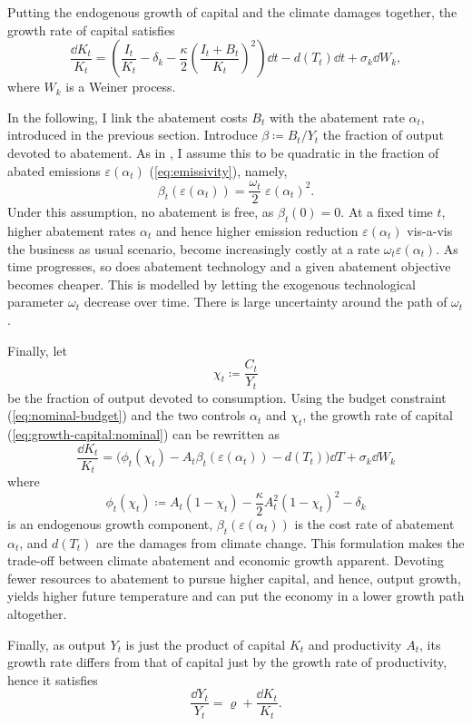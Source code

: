 \documentclass[../../main.tex]{subfiles}
\begin{document}
Putting the endogenous growth of capital and the climate damages together, the growth rate of capital satisfies \begin{equation} \label{eq:growth-capital:nominal}
    \frac{\dd{K}_t}{K_t} = \left(\frac{I_t}{K_t} - \delta_k - \frac{\kappa}{2} \left( \frac{I_t + B_t}{K_t} \right)^2 \right) \dd{t} - d(T_t) \dd{t} + \sigma_k \dd{W}_k,
\end{equation} where $W_k$ is a Weiner process.

In the following, I link the abatement costs $B_t$ with the abatement rate $\alpha_t$, introduced in the previous section. Introduce $\beta \coloneqq B_t / Y_t$ the fraction of output devoted to abatement. As in \cite{nordhaus_optimal_1992}, I assume this to be quadratic in the fraction of abated emissions $\varepsilon(\alpha_t)$ (\ref{eq:emissivity}), namely, \begin{equation} \label{eq:abatement-costs}
    \beta_t(\varepsilon(\alpha_t)) = \frac{\omega_t}{2} \; \varepsilon(\alpha_t)^2.
\end{equation} Under this assumption, no abatement is free, as $\beta_t(0) = 0$. At a fixed time $t$, higher abatement rates $\alpha_t$ and hence higher emission reduction $\varepsilon(\alpha_t)$ vis-a-vis the business as usual scenario, become increasingly costly at a rate $\omega_t \varepsilon(\alpha_t)$. As time progresses, so does abatement technology and a given abatement objective becomes cheaper. This is modelled by letting the exogenous technological parameter $\omega_t$ decrease over time. There is large uncertainty around the path of $\omega_t$. %

Finally, let \begin{equation}
    \chi_t \coloneqq \frac{C_t}{Y_t}
\end{equation} be the fraction of output devoted to consumption. Using the budget constraint (\ref{eq:nominal-budget}) and the two controls $\alpha_t$ and $\chi_t$, the growth rate of capital (\ref{eq:growth-capital:nominal}) can be rewritten as \begin{equation}
    \frac{\dd{K_t}}{K_t} = \Big(\phi_t(\chi_t) - A_t \beta_t(\varepsilon(\alpha_t)) - d(T_t) \Big) \dd{T} + \sigma_k \dd{W}_k
\end{equation} where \begin{equation}
    \phi_t(\chi_t) \coloneqq A_t (1 - \chi_t) - \frac{\kappa}{2} A_t^2 (1 - \chi_t)^2 - \delta_k
\end{equation} is an endogenous growth component, $\beta_t(\varepsilon(\alpha_t))$ is the cost rate of abatement $\alpha_t$, and $d(T_t)$ are the damages from climate change. This formulation makes the trade-off between climate abatement and economic growth apparent. Devoting fewer resources to abatement to pursue higher capital, and hence, output growth, yields higher future temperature and can put the economy in a lower growth path altogether.

Finally, as output $Y_t$ is just the product of capital $K_t$ and productivity $A_t$, its growth rate differs from that of capital just by the growth rate of productivity, hence it satisfies \begin{equation}
    \frac{\dd{Y}_t}{Y_t} = \varrho + \frac{\dd{K}_t}{K_t}. 
\end{equation}
\end{document}
